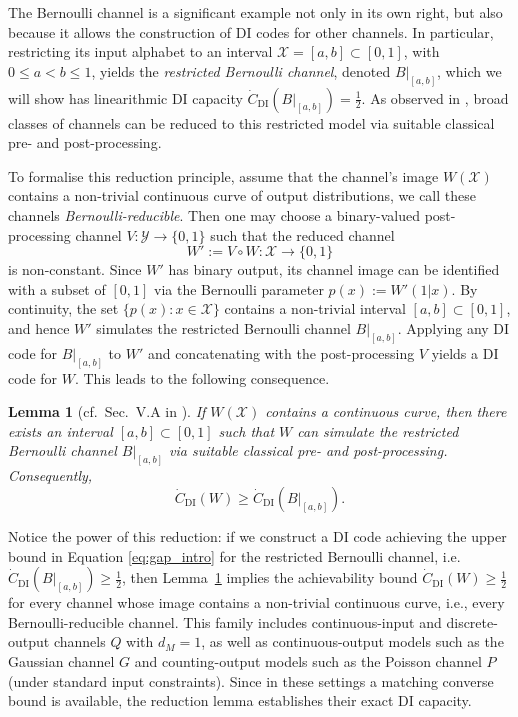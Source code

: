 \documentclass[10pt, conference]{IEEEtran}
\newtheorem{lemma}[theorem]{Lemma}
\newcommand{\1}{\mathds{1}}
\newcommand{\cX}{\mathcal{X}}
\newcommand{\cY}{\mathcal{Y}}
\begin{document}
The Bernoulli channel is a significant example not only in its own right, but also because it allows the construction of DI codes for other channels. In particular, restricting its input alphabet to an interval $\cX=[a,b]\subset[0,1]$, with $0\leq a < b \leq 1$, yields the \emph{restricted Bernoulli channel}, denoted $B|_{[a,b]}$, which we will show has linearithmic DI capacity $\dot C_{\text{DI}}(B|_{[a,b]})=\frac12$. As observed in \cite{CDBW:DI_classical}, broad classes of channels can be reduced to this restricted model via suitable classical pre- and post-processing.

To formalise this reduction principle, assume that the channel's image $W(\cX)$ contains a non-trivial continuous curve of output distributions, we call these channels \emph{Bernoulli-reducible}. Then one may choose a binary-valued post-processing channel $V:\cY\to\{0,1\}$ such that the reduced channel
\[
W':=V\circ W:\cX\to\{0,1\}
\]
is non-constant. Since $W'$ has binary output, its channel image can be identified with a subset of $[0,1]$ via the Bernoulli parameter $p(x):=W'(1|x)$. By continuity, the set $\{p(x):x\in\cX\}$ contains a non-trivial interval $[a,b]\subset[0,1]$, and hence $W'$ simulates the restricted Bernoulli channel $B|_{[a,b]}$. Applying any DI code for $B|_{[a,b]}$ to $W'$ and concatenating with the post-processing $V$ yields a DI code for $W$. This leads to the following consequence.

\begin{lemma}[cf.\ Sec.~V.A in \cite{CDBW:DI_classical}]\label{lemma:B_to_W}
If $W(\cX)$ contains a continuous curve, then there exists an interval $[a,b]\subset[0,1]$ such that $W$ can simulate the restricted Bernoulli channel $B|_{[a,b]}$ via suitable classical pre- and post-processing. Consequently,
\[
\dot{C}_{\text{DI}}(W) \geq \dot{C}_{\text{DI}}(B|_{[a,b]}).
\]
\end{lemma}

Notice the power of this reduction: if we construct a DI code achieving the upper bound in Equation \eqref{eq:gap_intro} for the restricted Bernoulli channel, i.e.\ $\dot{C}_{\text{DI}}(B|_{[a,b]})\geq \frac12$, then Lemma~\ref{lemma:B_to_W} implies the achievability bound $\dot{C}_{\text{DI}}(W)\geq \frac12$ for every channel whose image contains a non-trivial continuous curve, i.e., every Bernoulli-reducible channel. This family includes continuous-input and discrete-output channels $Q$ with $d_M=1$, as well as continuous-output models such as the Gaussian channel $G$ and counting-output models such as the Poisson channel $P$ (under standard input constraints). Since in these settings a matching converse bound is available, the reduction lemma establishes their exact DI capacity.
\end{document}

